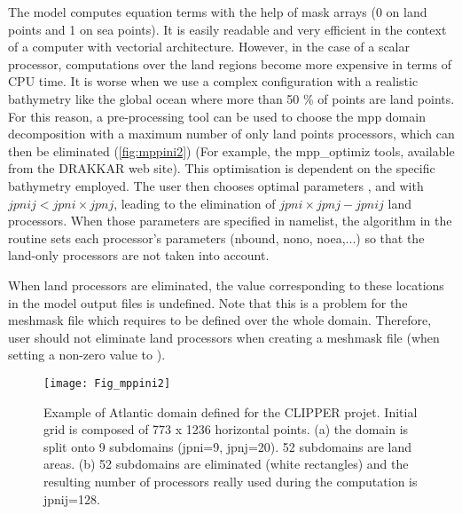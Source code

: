\documentclass[../main/NEMO_manual]{subfiles}
\begin{document}
The \NEMO model computes equation terms with the help of mask arrays (0 on land points and 1 on sea points).
It is easily readable and very efficient in the context of a computer with vectorial architecture.
However, in the case of a scalar processor, computations over the land regions become more expensive in
terms of CPU time. 
It is worse when we use a complex configuration with a realistic bathymetry like the global ocean where
more than 50 \% of points are land points.
For this reason, a pre-processing tool can be used to choose the mpp domain decomposition with a maximum number of
only land points processors, which can then be eliminated (\autoref{fig:mppini2})
(For example, the mpp\_optimiz tools, available from the DRAKKAR web site).
This optimisation is dependent on the specific bathymetry employed.
The user then chooses optimal parameters ,  and  with $jpnij < jpni \times jpnj$,
leading to the elimination of $jpni \times jpnj - jpnij$ land processors.
When those parameters are specified in  namelist,
the algorithm in the  routine sets each processor's parameters (nbound, nono, noea,...) so that
the land-only processors are not taken into account.


When land processors are eliminated,
the value corresponding to these locations in the model output files is undefined.
Note that this is a problem for the meshmask file which requires to be defined over the whole domain.
Therefore, user should not eliminate land processors when creating a meshmask file
(\ie when setting a non-zero value to ).

\begin{figure}[!ht]
  \begin{center}
    \texttt{[image: Fig\_mppini2]}
    \caption {
      \protect\label{fig:mppini2}
      Example of Atlantic domain defined for the CLIPPER projet.
      Initial grid is composed of 773 x 1236 horizontal points.
      (a) the domain is split onto 9  subdomains (jpni=9, jpnj=20).
      52 subdomains are land areas.
      (b) 52 subdomains are eliminated (white rectangles) and
      the resulting number of processors really used during the computation is jpnij=128.
    }
  \end{center}
\end{figure}
\end{document}
